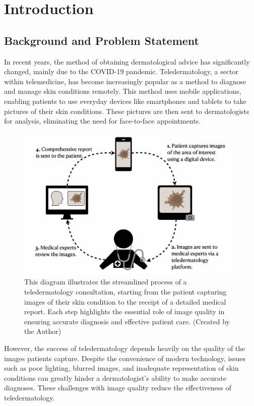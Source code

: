 \chapter{Introduction}
\label{ch:Introduction}

\section{Background and Problem Statement}
\label{sec:BackgroundProblemStatement}
In recent years, the method of obtaining dermatological advice has significantly changed, mainly due to the COVID-19 pandemic. Teledermatology, a sector within telemedicine, has become increasingly popular as a method to diagnose and manage skin conditions remotely. This method uses mobile applications, enabling patients to use everyday devices like smartphones and tablets to take pictures of their skin conditions. These pictures are then sent to dermatologists for analysis, eliminating the need for face-to-face appointments. \par
\vspace{\baselineskip}
\begin{figure}[ht]
    \centering
    \includegraphics[keepaspectratio,width=15cm]{img/TD_workflow.jpg}
    \caption{This diagram illustrates the streamlined process of a teledermatology consultation, starting from the patient capturing images of their skin condition to the receipt of a detailed medical report. Each step highlights the essential role of image quality in ensuring accurate diagnosis and effective patient care. (Created by the Author)}
    \label{fig:TD_workflow}
\end{figure}
However, the success of teledermatology depends heavily on the quality of the images patients capture. Despite the convenience of modern technology, issues such as poor lighting, blurred images, and inadequate representation of skin conditions can greatly hinder a dermatologist's ability to make accurate diagnoses. These challenges with image quality reduce the effectiveness of teledermatology. \par
